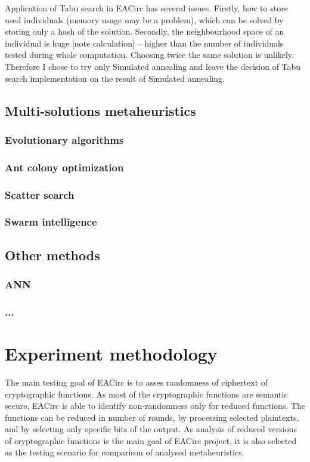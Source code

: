 \documentclass[
  print, %
  Table,   %
  nolof,     %
  nolot,     %
  11pt, %
  oneside  %
]{fithesis3}
\begin{document}
Application of Tabu search in EACirc has several issues. Firstly, how to store used individuals (memory usage may be a problem), which can be solved by storing only a hash of the solution. Secondly, the neighbourhood space of an individual is huge [note calculation] -- higher than the number of individuals tested during whole computation. Choosing twice the same solution is unlikely. Therefore I chose to try only Simulated annealing and leave the decision of Tabu search implementation on the result of Simulated annealing.

\section{Multi-solutions metaheuristics}
\subsection{Evolutionary algorithms}
\subsection{Ant colony optimization}
\subsection{Scatter search}
\subsection{Swarm intelligence}
\section{Other methods}
\subsection{ANN}
\subsection{...}



\chapter{Experiment methodology}

The main testing goal of EACirc is to asses randomness of ciphertext of cryptographic functions. As most of the cryptographic functions are semantic secure, EACirc is able to identify non-randomness only for reduced functions. The functions can be reduced in number of rounds, by processing selected plaintexts, and by selecting only specific bits of the output. As analysis of reduced versions of cryptographic functions is the main goal of EACirc project, it is also selected as the testing scenario for comparison of analysed metaheuristics.
\end{document}
